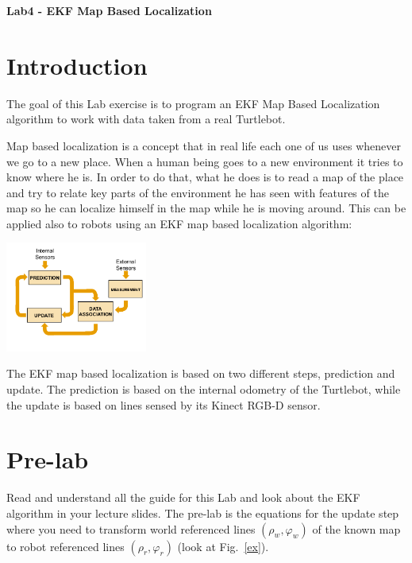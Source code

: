 \documentclass[a4paper,10pt]{article}
\begin{document}
\marginsize{2cm}{2cm}{2cm}{2cm}

\begin{center}
\Large \textbf{Lab4 - EKF Map Based Localization}
\end{center}

\section{Introduction}

The goal of this Lab exercise is to program an EKF Map Based Localization algorithm to work with data taken from a real Turtlebot.

Map based localization is a concept that in real life each one of us uses whenever we go to a new place. When a human being goes to a new environment it tries to know where he is. In order to do that, what he does is to read a map of the place and try to relate key parts of the environment he has seen with features of the map so he can localize himself in the map while he is moving around. This can be applied also to robots using an EKF map based localization algorithm:

\begin{center}
	\includegraphics[width=0.35\textwidth]{pict/ekf_pic.png}
	\label{measur}
\end{center}

The EKF map based localization is based on two different steps, prediction and update. The prediction is based on the internal odometry of the Turtlebot, while the update is based on lines sensed by its Kinect RGB-D sensor.

\section{Pre-lab}

Read and understand all the guide for this Lab and look about the EKF algorithm in your lecture slides. The pre-lab is the equations for the update step where you need to transform world referenced lines $(\rho_w, \varphi_w)$ of the known map to robot referenced lines $(\rho_r, \varphi_r)$ (look at Fig.~\ref{ex}).
\end{document}
